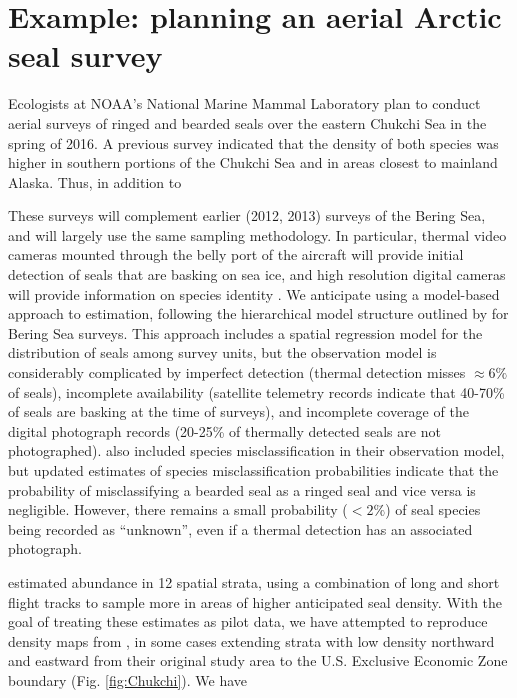 \documentclass[fleqn,10pt]{wlpeerj}
\begin{document}
\section*{Example: planning an aerial Arctic seal survey}

Ecologists at NOAA's National Marine Mammal Laboratory plan to conduct aerial surveys of ringed and bearded seals over the eastern Chukchi Sea in the spring of 2016.  A previous survey \citep{Bengtson2005} indicated that the density of both species was higher in southern portions of the Chukchi Sea and in areas closest to mainland Alaska. Thus, in addition to  



These surveys will complement earlier (2012, 2013) surveys of the Bering Sea, and will largely use the same sampling methodology.  In particular, thermal video cameras mounted through the belly port of the aircraft will provide initial detection of seals that are basking on sea ice, and high resolution digital cameras will provide information on species identity \citep{ConnEtAl2014}.  We anticipate using a model-based approach to estimation, following the hierarchical model structure outlined by \citet{ConnEtAl2014} for Bering Sea surveys.  This approach includes a spatial regression model for the distribution of seals among survey units, but the observation model is considerably complicated by imperfect detection (thermal detection misses $\approx 6\%$ of seals), incomplete availability (satellite telemetry records indicate that 40-70\% of seals are basking at the time of surveys), and incomplete coverage of the digital photograph records (20-25\% of thermally detected seals are not photographed).  \citet{ConnEtAl2014} also included species misclassification in their observation model, but updated estimates of species misclassification probabilities \citep{McClintockEtAlInReview} indicate that the probability of misclassifying a bearded seal as a ringed seal and vice versa is negligible.  However, there remains a small probability ($<2\%$) of seal species being recorded as ``unknown'', even if a thermal detection has an associated photograph.



\citet{Bengtson2005} estimated abundance in 12 spatial strata, using a combination of long and short flight tracks to sample more in areas of higher anticipated seal density.  With the goal of treating these estimates as pilot data, we have attempted to reproduce density maps from \citet{Bengtson2005}, in some cases extending strata with low density northward and eastward from their original study area to the U.S. Exclusive Economic Zone boundary (Fig. \ref{fig:Chukchi}). We have 
\end{document}
